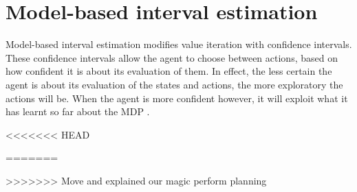 \section{Model-based interval estimation}
\label{sec:mbie}

Model-based interval estimation modifies value iteration with confidence
intervals. These confidence intervals allow the agent to choose between
actions, based on how confident it is about its evaluation of them. In effect,
the less certain the agent is about its evaluation of the states and actions,
the more exploratory the actions will be. When the agent is more confident
however, it will exploit what it has learnt so far about the MDP
\parencite{dietterich2013pac}.


<<<<<<< HEAD

=======

>>>>>>> Move and explained our magic perform planning

